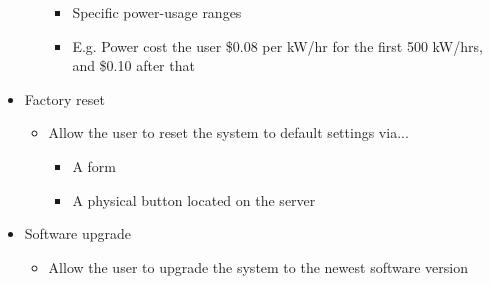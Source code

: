 \begin{itemize}
\begin{itemize}
\begin{itemize}
		\item Specific power-usage ranges
		 \item E.g. Power cost the user \$0.08 per kW/hr for 
		 	the first 500 kW/hrs, and \$0.10 after that
		\end{itemize}
	\end{itemize}
 \item Factory reset
	\begin{itemize}
	 \item Allow the user to reset the system to default settings via...
		\begin{itemize}
		 \item A form
		 \item A physical button located on the server
		\end{itemize}
	\end{itemize}
 \item Software upgrade
	\begin{itemize}
	 \item Allow the user to upgrade the system to the newest software version
	\end{itemize}
\end{itemize}
